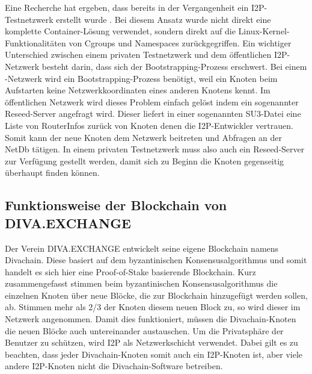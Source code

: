 Eine Recherche hat ergeben, dass bereits in der Vergangenheit ein I2P-Testnetzwerk erstellt wurde \parencite{noauthor_how_2018}.
Bei diesem Ansatz wurde nicht direkt eine komplette Container-Lösung verwendet, sondern direkt auf die Linux-Kernel-Funktionalitäten von Cgroups und Namespaces zurückgegriffen.
Ein wichtiger Unterschied zwischen einem privaten Testnetzwerk und dem öffentlichen I2P-Netzwerk besteht darin, dass sich der Bootstrapping-Prozess erschwert.
Bei einem -Netzwerk wird ein Bootstrapping-Prozess benötigt, weil ein Knoten beim Aufstarten keine Netzwerkkoordinaten eines anderen Knotens kennt.
Im öffentlichen Netzwerk wird dieses Problem einfach gelöst indem ein sogenannter Reseed-Server angefragt wird.
Dieser liefert in einer sogenannten SU3-Datei eine Liste von RouterInfos zurück von Knoten denen die I2P-Entwickler vertrauen.
Somit kann der neue Knoten dem Netzwerk beitreten und Abfragen an der NetDb tätigen.
In einem privaten Testnetzwerk muss also auch ein Reseed-Server zur Verfügung gestellt werden, damit sich zu Beginn die Knoten gegenseitig überhaupt finden können.

\subsection{Funktionsweise der Blockchain von DIVA.EXCHANGE}\label{sec:divachain}

Der Verein DIVA.EXCHANGE entwickelt seine eigene Blockchain namens Divachain.
Diese basiert auf dem byzantinischen Konsensusalgorithmus und somit handelt es sich hier eine Proof-of-Stake basierende Blockchain.
Kurz zusammengefasst stimmen beim byzantinischen Konsensusalgorithmus die einzelnen Knoten über neue Blöcke, die zur Blockchain hinzugefügt werden sollen, ab.
Stimmen mehr als 2/3 der Knoten diesem neuen Block zu, so wird dieser im Netzwerk angenommen.
Damit dies funktioniert, müssen die Divachain-Knoten die neuen Blöcke auch untereinander austauschen.
Um die Privatsphäre der Benutzer zu schützen, wird I2P als Netzwerkschicht verwendet.
Dabei gilt es zu beachten, dass jeder Divachain-Knoten somit auch ein I2P-Knoten ist, aber viele andere I2P-Knoten nicht die Divachain-Software betreiben. 

